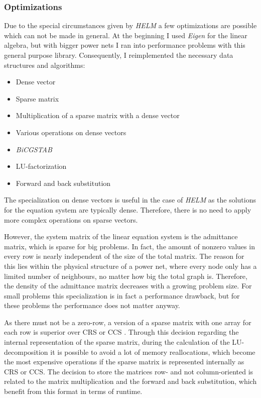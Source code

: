 \subsubsection{Optimizations}
Due to the special circumstances given by \emph{HELM} a few optimizations are possible which can not be made in general. At the beginning I used \emph{Eigen} for the linear algebra, but with bigger power nets I ran into performance problems with this general purpose library. Consequently, I reimplemented the necessary data structures and algorithms:
\begin{itemize}
	\item Dense vector
	\item Sparse matrix
	\item Multiplication of a sparse matrix with a dense vector
	\item Various operations on dense vectors
	\item \emph{BiCGSTAB}
	\item LU-factorization
	\item Forward and back substitution
\end{itemize}

The specialization on dense vectors is useful in the case of \emph{HELM} as the solutions for the equation system are typically dense. Therefore, there is no need to apply more complex operations on sparse vectors.

However, the system matrix of the linear equation system is the admittance matrix, which is sparse for big problems. In fact, the amount of nonzero values in every row is nearly independent of the size of the total matrix. The reason for this lies within the physical structure of a power net, where every node only has a limited number of neighbours, no matter how big the total graph is. Therefore, the density of the admittance matrix decreases with a growing problem size. For small problems this specialization is in fact a performance drawback, but for these problems the performance does not matter anyway.

As there must not be a zero-row, a version of a sparse matrix with one array for each row is superior over CRS \cite{sparseMatricesJava} or CCS \cite{sparseMatricesJava}. Through this decision regarding the internal representation of the sparse matrix, during the calculation of the LU-decomposition it is possible to avoid a lot of memory reallocations, which become the most expensive operations if the sparse matrix is represented internally as CRS or CCS. The decision to store the matrices row- and not column-oriented is related to the matrix multiplication and the forward and back substitution, which benefit from this format in terms of runtime.

